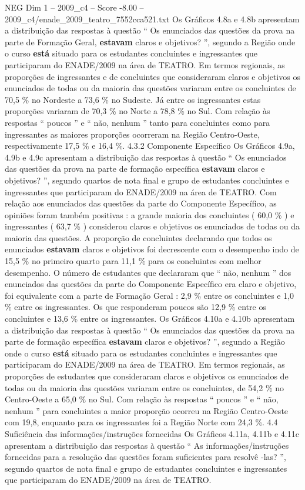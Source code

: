 \begin{textsample}{NEG Dim 1 – 2009\_c4 – Score -8.00 – 2009\_c4/enade\_2009\_teatro\_7552cca521.txt}
Os Gráficos 4.8a e 4.8b apresentam a distribuição das respostas à questão “ Os enunciados das questões da prova na parte de Formação Geral, \textbf{estavam} claros e objetivos? ”, segundo a Região onde o curso \textbf{está} situado para os estudantes concluintes e ingressantes que participaram do ENADE/2009 na área de TEATRO.
Em termos regionais, as proporções de ingressantes e de concluintes que consideraram claros e objetivos os enunciados de todas ou da maioria das questões variaram entre os concluintes de 70,5 \% no Nordeste a 73,6 \% no Sudeste.
Já entre os ingressantes estas proporções variaram de 70,3 \% no Norte a 78,8 \% no Sul.
Com relação às respostas “ poucos ” e “ não, nenhum ” tanto para concluintes como para ingressantes as maiores proporções ocorreram na Região Centro-Oeste, respectivamente 17,5 \% e 16,4 \%. 4.3.2 Componente Específico Os Gráficos 4.9a, 4.9b e 4.9c apresentam a distribuição das respostas à questão “ Os enunciados das questões da prova na parte de formação específica \textbf{estavam} claros e objetivos? ”, segundo quartos de nota final e grupo de estudantes concluintes e ingressantes que participaram do ENADE/2009 na área de TEATRO.
Com relação aos enunciados das questões da parte do Componente Específico, as opiniões foram também positivas : a grande maioria dos concluintes ( 60,0 \% ) e ingressantes ( 63,7 \% ) considerou claros e objetivos os enunciados de todas ou da maioria das questões.
A proporção de concluintes declarando que todos os enunciados \textbf{estavam} claros e objetivos foi decrescente com o desempenho indo de 15,5 \% no primeiro quarto para 11,1 \% para os concluintes com melhor desempenho.
O número de estudantes que declararam que “ não, nenhum ” dos enunciados das questões da parte do Componente Específico era claro e objetivo, foi equivalente com a parte de Formação Geral : 2,9 \% entre os concluintes e 1,0 \% entre os ingressantes.
Os que responderam poucos são 12,9 \% entre os concluintes e 13,6 \% entre os ingressantes.
Os Gráficos 4.10a e 4.10b apresentam a distribuição das respostas à questão “ Os enunciados das questões da prova na parte de formação específica \textbf{estavam} claros e objetivos? ”, segundo a Região onde o curso \textbf{está} situado para os estudantes concluintes e ingressantes que participaram do ENADE/2009 na área de TEATRO.
Em termos regionais, as proporções de estudantes que consideraram claros e objetivos os enunciados de todas ou da maioria das questões variaram entre os concluintes, de 54,2 \% no Centro-Oeste a 65,0 \% no Sul.
Com relação às respostas “ poucos ” e “ não, nenhum ” para concluintes a maior proporção ocorreu na Região Centro-Oeste com 19,8, enquanto para os ingressantes foi a Região Norte com 24,3 \%. 4.4 Suficiência das informações/instruções fornecidas Os Gráficos 4.11a, 4.11b e 4.11c apresentam a distribuição das respostas à questão “ As informações/instruções fornecidas para a resolução das questões foram suficientes para resolvê -las? ”, segundo quartos de nota final e grupo de estudantes concluintes e ingressantes que participaram do ENADE/2009 na área de TEATRO.

\end{textsample}

